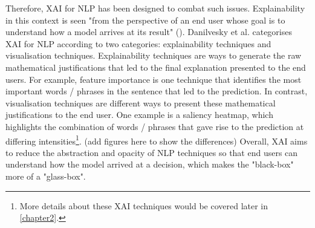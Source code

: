 Therefore, XAI for NLP has been designed to combat such issues. Explainability in this context is seen "from the perspective of an end user whose goal is to understand how a model arrives at its result" (\cite{danilevsky2020}). Danilvesky et al. categorises XAI for NLP according to two categories: explainability techniques and visualisation techniques. Explainability techniques are ways to generate the raw mathematical justifications that led to the final explanation presented to the end users. For example, feature importance is one technique that identifies the most important words / phrases in the sentence that led to the prediction. In contrast, visualisation techniques are different ways to present these mathematical justifications to the end user. One example is a saliency heatmap, which highlights the combination of words / phrases that gave rise to the prediction at differing intensities\footnote{More details about these XAI techniques would be covered later in \autoref{chapter2}.}. (add figures here to show the differences) Overall, XAI aims to reduce the abstraction and opacity of NLP techniques so that end users can understand how the model arrived at a decision, which makes the "black-box" more of a "glass-box".

